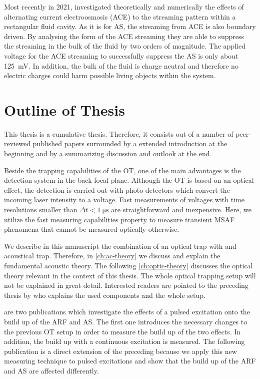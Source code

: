 Most recently in 2021,  investigated theoretically and 
numerically the effects of alternating current electroosmosis (ACE) to the 
streaming pattern within a rectangular fluid cavity. As it is for AS, the 
streaming from ACE is also boundary driven. By analysing the form of the ACE 
streaming they are able to suppress the streaming in the bulk of the fluid by 
two orders of magnitude. The applied voltage for the ACE streaming to 
successfully suppress the AS is only about \SI{125}{\milli\volt}. In addition, 
the bulk of the fluid is charge neutral and therefore no electric charges could 
harm possible living objects within the system.

\section{Outline of Thesis\label{sec:I-outline}}

This thesis is a cumulative thesis. Therefore, it consists out of a number of 
peer-reviewed published papers surrounded by a extended introduction at the 
beginning and by a summarizing discussion and outlook at the end.

Beside the trapping capabilities of the OT, one of the main advantages is the 
detection system in the back focal plane. Although the OT is based on an 
optical effect, the detection is carried out with photo detectors which convert 
the incoming laser intensity to a voltage. Fast measurements of voltages with 
time resolutions smaller than $\Delta t < \SI{1}{\us}$ are straightforward and 
inexpensive. Here, we utilize the fast measuring capabilities property to 
measure transient MSAF phenomena that cannot be measured optically otherwise.

We describe in this manuscript the combination of an optical trap with and 
acoustical trap. Therefore, in \cref{ch:ac-theory} we discuss and explain the 
fundamental acoustic theory. The following \cref{ch:optic-theory} discusses the 
optical theory relevant in the context of this thesis. The whole optical 
trapping setup will not be explained in great detail. Interested readers are 
pointed to the preceding thesis by  who explains the used 
components and the whole setup.

 are two publications which investigate the 
effects of a pulsed excitation onto the build up of the ARF and AS. The first 
one introduces the necessary changes to the previous OT setup in order to 
measure the build up of the two effects. In addition, the build up with a 
continuous excitation is measured. The following publication is a direct 
extension of the preceding because we apply this new measuring technique to 
pulsed excitations and show that the build up of the ARF and AS are affected 
differently.

